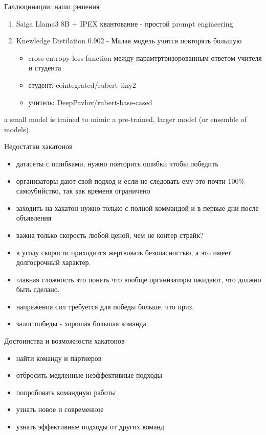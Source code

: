 \documentclass[presentation]{beamer}
\begin{document}
\begin{frame}[label={sec:org86845b4}]{Галлюцинации: наши решения}
\begin{enumerate}
\item Saiga Llama3 8B + IPEX квантование - простой prompt engineering
\item Knewledge Distilation 0.902 - Малая модель учится повторять большую
\begin{itemize}
\item cross-entropy loss function между парамтртризорованным ответом учителя и студента
\item студент: cointegrated/rubert-tiny2
\item учитель: DeepPavlov/rubert-base-cased
\end{itemize}
\end{enumerate}











a small model is trained to mimic a pre-trained, larger model (or ensemble of models)
\end{frame}

\begin{frame}[label={sec:orgf9ddb59}]{Недостатки хакатонов}
\begin{itemize}
\item датасеты с ошибками, нужно повторить ошибки чтобы победить
\item организаторы дают свой подход и если не следовать ему это почти 100\% самоубийство, так как временя ограничено
\item заходить на хакатон нужно только с полной коммандой и в первые дни после объявления
\item важна только скорость любой ценой, чем не контер страйк?
\item в угоду скорости приходится жертвовать безопасностью, а это имеет долгосрочный характер.
\item главная сложность это понять что вообще организаторы ожидают, что должно быть сделано.
\item напряжения сил требуется для победы больше, что приз.
\item залог победы - хорошая большая команда
\end{itemize}
\end{frame}

\begin{frame}[label={sec:orgb7c06ca}]{Достоинства и возможности хакатонов}
\begin{itemize}
\item найти команду и партнеров
\item отбросить медленные неэффективные подходы
\item попробовать командную работы
\item узнать новое и современное
\item узнать эффективные подходы от других команд
\end{itemize}
\end{frame}
\end{document}

